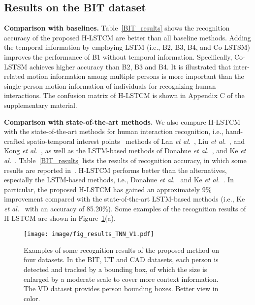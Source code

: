 \documentclass[9pt,journal,letterpaper,twocolumn]{IEEEtran}
\begin{document}
	
	
	\subsection{Results on the BIT dataset}
	
	{\bf Comparison with baselines.} Table~\ref{BIT_results} shows the recognition accuracy of the proposed H-LSTCM are better than all baseline methods. Adding the temporal information by employing LSTM (i.e., B2, B3, B4, and Co-LSTSM) improves the performance of B1 without temporal information. Specifically,  Co-LSTSM achieves higher accuracy than B2, B3 and B4. It is illustrated that inter-related motion information among multiple persons is more important than the single-person motion information of individuals for recognizing human interactions. The confusion matrix of H-LSTCM is shown in Appendix C of the supplementary material. 


	

	
	{\bf  Comparison with state-of-the-art methods.} We also compare H-LSTCM
	with the state-of-the-art methods for human interaction recognition, i.e., hand-crafted spatio-temporal interest
	points~\cite{DollarVSPETS05cuboids} methods of Lan {\em et al.}~\cite{lan2012discriminative}, Liu {\em et al.}~\cite{liu2011recognizing}, and Kong {\em et al.}~\cite{kong2012leraning,kong2014interactive,kong2016close}, as well as the LSTM-based methods of  Donahue {\em et al.}~\cite{donahue2015long}, and Ke {\em et al.}~\cite{ke2016spatial}. Table~\ref{BIT_results} lists the results of recognition accuracy, in which some results are reported in~\cite{kong2014interactive,kong2016close}. H-LSTCM performs better than the alternatives, especially the LSTM-based methods, i.e., Donahue {\em et al.}~\cite{donahue2015long} and Ke {\em et al.}~\cite{ke2016spatial}. In particular, the proposed H-LSTCM has gained an approximately 9\% improvement compared
	with the state-of-the-art LSTM-based methods (i.e., Ke {\em et al.}~\cite{ke2016spatial} with an accuracy of 85.20\%). Some examples of the recognition results of H-LSTCM are shown in Figure~\ref{fig_results}(a).
	
		\begin{figure}[!t]
		\centering \texttt{[image: image/fig\_results\_TNN\_V1.pdf]}
		\vspace{-2mm}
		\caption{ Examples of some recognition results of the proposed method on four datasets. In the  BIT, UT and CAD datasets, each person is detected and tracked by a bounding box, of which the size is enlarged by a moderate scale to cover more context information. The VD dataset provides person bounding boxes. Better view in color.}\label{fig_results}
		\vspace{-1mm}
	\end{figure}
	
\end{document}

